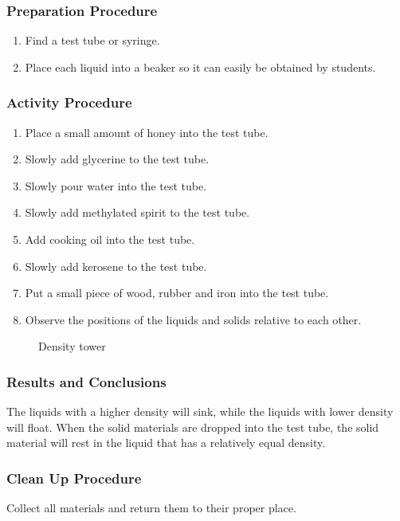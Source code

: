 \subsubsection*{Preparation Procedure}
\begin{enumerate}
\item{Find a test tube or syringe.}
\item{Place each liquid into a beaker so it can easily be obtained by students.} 
\end{enumerate}

\subsubsection*{Activity Procedure}
\begin{enumerate}
\item{Place a small amount of honey into the test tube.} 
\item{Slowly add glycerine to the test tube.} 
\item{Slowly pour water into the test tube.} 
\item{Slowly add methylated spirit to the test tube.} 
\item{Add cooking oil into the test tube.} 
\item{Slowly add kerosene to the test tube.} 
\item{Put a small piece of wood, rubber and iron into the test tube.}
\item{Observe the positions of the liquids and solids relative to each other.}

\end{enumerate}
\begin{figure}[h]
\begin{center}
\def\svgwidth{200pt}

\caption{Density tower}
\label{fig:density-tower}
\end{center}
\end{figure}

\subsubsection*{Results and Conclusions}
The liquids with a higher density will sink, while the liquids with lower density will float. When the solid materials are dropped into the test tube, the solid material will rest in the liquid that has a relatively equal density.  

\subsubsection*{Clean Up Procedure}
Collect all materials and return them to their proper place.

